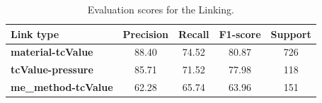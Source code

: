 \documentclass[]{interact}
\theoremstyle{plain}%
\theoremstyle{definition}
\theoremstyle{remark}
\newcommand{\tc}{T$_{c}$}
\begin{document}
\begin{table}[ht]
    \centering\small
    \begin{tabular}{lcccc}
        \toprule
        \textbf{Link type}          & \textbf{Precision} & \textbf{Recall} & \textbf{F1-score} & Support \\
        \midrule
        \textbf{material-tcValue}   & 88.40              & 74.52           & 80.87             & 726     \\
        \textbf{tcValue-pressure}   & 85.71              & 71.52           & 77.98             & 118     \\
        \textbf{me\_method-tcValue} & 62.28              & 65.74           & 63.96             & 151     \\
        \bottomrule
    \end{tabular}
    \caption{\label{table:evaluation-linking} Evaluation scores for the Linking. }
\end{table}

\end{document}
